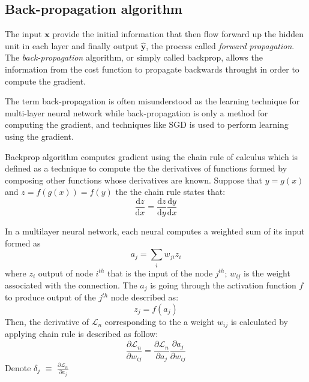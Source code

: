 \subsection{Back-propagation algorithm}
\hspace{0.5cm}The input $\pmb{x}$ provide the initial information that then flow forward up the hidden unit in each layer and finally output $\hat{\pmb{y}}$, the process called \textit{forward propagation}. The \textit{back-propagation} algorithm, or simply called backprop, allows the information from the cost function to propagate backwards throught in order to compute the gradient.\par
The term back-propagation is often misunderstood as the learning technique for multi-layer neural network while back-propagation is only a method for computing the gradient, and techniques like SGD is used to perform learning using the gradient.\par
Backprop algorithm computes gradient using the chain rule of calculus which is defined as a technique to compute the the derivatives of functions formed by composing other functions whose derivatives are known. Suppose that $y=g(x)$ and $z = f(g(x)) = f(y)$ the the chain rule states that:
\begin{equation}
    \frac{\text{d}z}{\text{d}x}  = \frac{\text{d}z}{\text{d}y}\frac{\text{d}y}{\text{d}x}
\end{equation}\par
In a multilayer neural network, each neural computes a weighted sum of its input formed as
\begin{equation}
    a_j = \underset{i}{\sum}w_{ji}z_i
\end{equation}
where $z_i$ output of node $i^{th}$ that is the input of the node $j^{th}$; $w_{ij}$ is the weight associated with the connection. The $a_j$ is going through the activation function $f$ to produce output of the $j^{th}$
node described as:
\begin{equation}
    z_j = f(a_j)
\end{equation}
Then, the derivative of $\mathcal{L}_n$ corresponding to the a weight $w_{ij}$ is calculated by applying chain rule is described as follow:
\begin{equation}
    \frac{\partial \mathcal{L}_n}{ \partial w_{ij}} = \frac{\partial \mathcal{L}_n}{ \partial a_{j}}\frac{\partial a_{j}}{ \partial w_{ij}}
\end{equation}
Denote $\delta_j$ $\equiv$ $\frac{\partial \mathcal{L}_n}{ \partial a_{j}}$
\par
